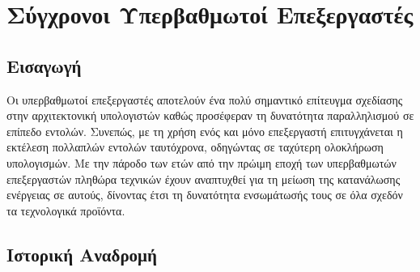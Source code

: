 \chapter{Σύγχρονοι Υπερβαθμωτοί Επεξεργαστές}
\label{chap2}

\section{Εισαγωγή}
\label{chap2_Intro}

Οι υπερβαθμωτοί επεξεργαστές \cite{nikolos2012architecture} αποτελούν ένα πολύ σημαντικό επίτευγμα σχεδίασης στην αρχιτεκτονική υπολογιστών καθώς προσέφεραν τη δυνατότητα παραλληλισμού σε επίπεδο εντολών. Συνεπώς, με τη χρήση ενός και μόνο επεξεργαστή επιτυγχάνεται η εκτέλεση πολλαπλών εντολών ταυτόχρονα, οδηγώντας σε ταχύτερη ολοκλήρωση υπολογισμών. Με την πάροδο των ετών από την πρώιμη εποχή των υπερβαθμωτών επεξεργαστών πληθώρα τεχνικών έχουν αναπτυχθεί για τη μείωση της κατανάλωσης ενέργειας σε αυτούς, δίνοντας έτσι τη δυνατότητα ενσωμάτωσής τους σε όλα σχεδόν τα τεχνολογικά προϊόντα.


\section{Ιστορική Αναδρομή}
\label{chap2_History}

